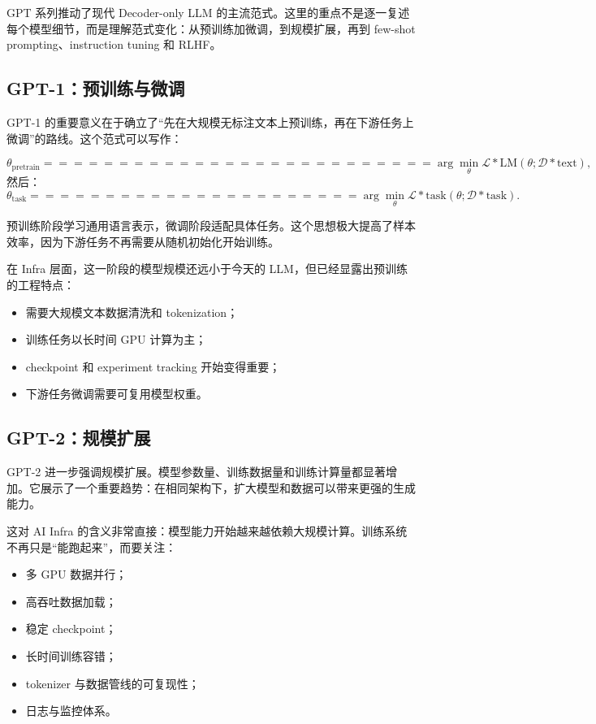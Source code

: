 GPT 系列推动了现代 Decoder-only LLM 的主流范式。这里的重点不是逐一复述每个模型细节，而是理解范式变化：从预训练加微调，到规模扩展，再到 few-shot prompting、instruction tuning 和 RLHF。

\subsection{GPT-1：预训练与微调}
\label{subsec:gpt1-pretrain-finetune}

GPT-1 的重要意义在于确立了“先在大规模无标注文本上预训练，再在下游任务上微调”的路线。这个范式可以写作：

\[
\theta_{\mathrm{pretrain}}
==========================

\arg\min_{\theta}
\mathcal{L}*{\mathrm{LM}}(\theta;\mathcal{D}*{\mathrm{text}}),
\]
然后：
\[
\theta_{\mathrm{task}}
======================

\arg\min_{\theta}
\mathcal{L}*{\mathrm{task}}(\theta;\mathcal{D}*{\mathrm{task}}).
\]

预训练阶段学习通用语言表示，微调阶段适配具体任务。这个思想极大提高了样本效率，因为下游任务不再需要从随机初始化开始训练。

在 Infra 层面，这一阶段的模型规模还远小于今天的 LLM，但已经显露出预训练的工程特点：

\begin{itemize}
\item 需要大规模文本数据清洗和 tokenization；
\item 训练任务以长时间 GPU 计算为主；
\item checkpoint 和 experiment tracking 开始变得重要；
\item 下游任务微调需要可复用模型权重。
\end{itemize}

\subsection{GPT-2：规模扩展}
\label{subsec:gpt2-scaling}

GPT-2 进一步强调规模扩展。模型参数量、训练数据量和训练计算量都显著增加。它展示了一个重要趋势：在相同架构下，扩大模型和数据可以带来更强的生成能力。

这对 AI Infra 的含义非常直接：模型能力开始越来越依赖大规模计算。训练系统不再只是“能跑起来”，而要关注：

\begin{itemize}
\item 多 GPU 数据并行；
\item 高吞吐数据加载；
\item 稳定 checkpoint；
\item 长时间训练容错；
\item tokenizer 与数据管线的可复现性；
\item 日志与监控体系。
\end{itemize}

